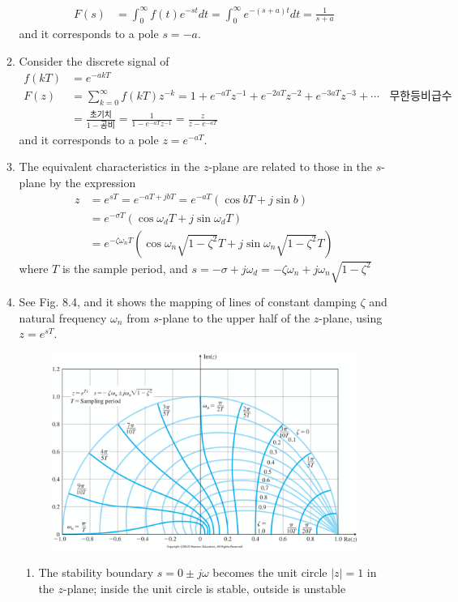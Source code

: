\documentclass[landscape,14pt]{oblivoir}
\begin{document}
\begin{itemize}
\begin{enumerate}
\begin{align*}
			F(s) &= \int_0^{\infty} f(t) e^{-st} dt  = \int_0^{\infty} e^{-(s+a)t} dt = 
			\frac{1}{s+a}
		\end{align*}
		and it corresponds to a pole $s=-a$. 
		\item Consider the discrete signal of 
		\begin{align*}
			f(kT) &= e^{-akT}  \\  
			F(z) &= \sum_{k=0}^{\infty} f(kT) z^{-k}   = 1 + e^{-aT} z^{-1} + e^{-2aT} z^{-2} + e^{-3aT} z^{-3} +  \cdots ~~~~\mbox{무한등비급수} \\
			&= \frac{\mbox{초기치}}{1- \mbox{공비}} = \frac{1}{1-e^{-aT}z^{-1}} = \frac{z}{z-e^{-aT}}
		\end{align*}
		and it corresponds to a pole $z=e^{-aT}$. 
		\item The equivalent characteristics in the $z$-plane are related to those in the $s$-plane by the expression
		\begin{align*}
			z &= e^{sT} = e^{-aT +jbT} = e^{-aT} (\cos bT + j \sin b) \\
			&= e^{-\sigma T} (\cos \omega_d T + j \sin \omega_d T ) \\
			&= e^{-\zeta \omega_n T} (\cos \omega_n \sqrt{1-\zeta^2} T + j \sin \omega_n \sqrt{1-\zeta^2} T )
		\end{align*}
		where $T$ is the sample period, and $s = -\sigma  + j \omega_d = -\zeta \omega_n + j \omega_n \sqrt{1-\zeta^2} $
\newpage
%
		\item See Fig. 8.4, and it shows the mapping of lines of constant damping $\zeta$ and natural frequency $\omega_n$ from $s$-plane to the upper half of the $z$-plane, using $z = e^{sT}$. 
		\begin{figure}[h]
			\includegraphics[width=10cm]{./FIG_Franklin/fig8-4.png}
		\end{figure}
		\begin{enumerate}
			\item The stability boundary $s= 0 \pm j\omega$ becomes the unit circle $|z| =1$ in the $z$-plane; inside the unit circle is stable, outside is unstable

\end{enumerate}
\end{enumerate}
\end{itemize}
\end{document}
